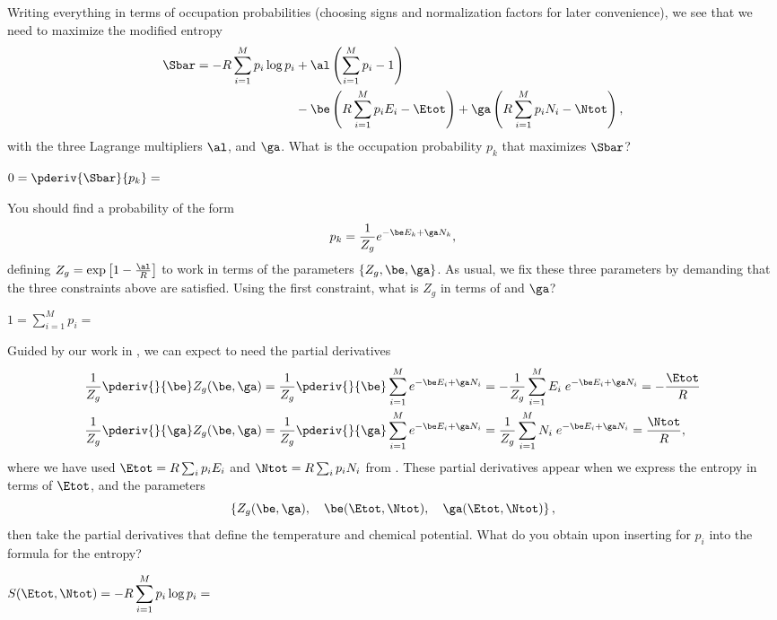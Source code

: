 Writing everything in terms of occupation probabilities (choosing signs and normalization factors for later convenience), we see that we need to maximize the modified entropy
\begin{align*}
  \Sbar = -R \sum_{i = 1}^M p_i \log p_i & + \al\left(\sum_{i = 1}^M p_i - 1\right) \\
                                         & - \be\left(R \sum_{i = 1}^M p_i E_i - \Etot\right) + \ga\left(R \sum_{i = 1}^M p_i N_i - \Ntot\right),
\end{align*}
with the three Lagrange multipliers $\al$, \be and $\ga$.
What is the occupation probability $p_k$ that maximizes $\Sbar$?
\begin{mdframed}
  $\displaystyle 0 = \pderiv{\Sbar}{p_k} = $ \\[140 pt] %
\end{mdframed}

You should find a probability of the form
\begin{equation}
  \label{eq:grand_Lagrange}
  p_k = \frac{1}{Z_g} e^{-\be E_k + \ga N_k},
\end{equation}
defining $Z_g = \exp\left[1 - \frac{\al}{R}\right]$ to work in terms of the parameters $\left\{Z_g, \be, \ga\right\}$.
As usual, we fix these three parameters by demanding that the three constraints above are satisfied.
Using the first constraint, what is $Z_g$ in terms of \be and $\ga$?
\begin{mdframed}
  $\displaystyle 1 = \sum_{i = 1}^M p_i = $ \\[50 pt]
\end{mdframed}

Guided by our work in , we can expect to need the partial derivatives
\begin{align}
  \frac{1}{Z_g} \pderiv{}{\be} Z_g(\be, \ga) & = \frac{1}{Z_g} \pderiv{}{\be} \sum_{i = 1}^M e^{-\be E_i + \ga N_i} = -\frac{1}{Z_g} \sum_{i = 1}^M E_i \; e^{-\be E_i + \ga N_i} = -\frac{\Etot}{R} \label{eq:grand_be_deriv} \\
  \frac{1}{Z_g} \pderiv{}{\ga} Z_g(\be, \ga) & = \frac{1}{Z_g} \pderiv{}{\ga} \sum_{i = 1}^M e^{-\be E_i + \ga N_i} = \frac{1}{Z_g} \sum_{i = 1}^M N_i \; e^{-\be E_i + \ga N_i} = \frac{\Ntot}{R} \label{eq:grand_ga_deriv},
\end{align}
where we have used $\Etot = R \sum_i p_i E_i$ and $\Ntot = R \sum_i p_i N_i$ from .
These partial derivatives appear when we express the entropy in terms of $\Etot$, \Ntot and the parameters
\begin{equation*}
  \left\{Z_g(\be, \ga), \quad \be(\Etot, \Ntot), \quad \ga(\Etot, \Ntot)\right\},
\end{equation*}
then take the partial derivatives that define the temperature and chemical potential.
What do you obtain upon inserting  for $p_i$ into the formula for the entropy?
\begin{mdframed}
  $\displaystyle S(\Etot, \Ntot) = -R \sum_{i = 1}^M p_i \log p_i = $ \\[100 pt]
\end{mdframed}


